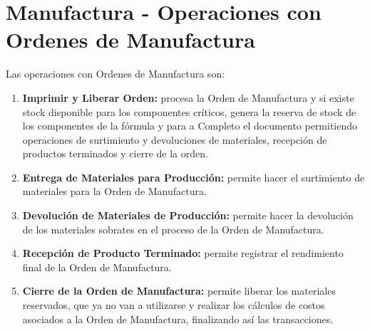 \documentclass[letterpaper,10pt,spanish]{sphinxmanual}
\begin{document}
\section{Manufactura - Operaciones con Ordenes de Manufactura}
\label{manufactura-operaciones:manufactura-operaciones-con-ordenes-de-manufactura}\label{manufactura-operaciones::doc}
Las operaciones con Ordenes de Manufactura son:
\begin{enumerate}
\item {} 
\textbf{Imprimir y Liberar Orden:} procesa la Orden de Manufactura y si existe stock disponible para los componentes críticos, genera la reserva de stock de los componentes de la fórmula y para a Completo el documento permitiendo operaciones de surtimiento y devoluciones de materiales, recepción de productos terminados y cierre de la orden.

\item {} 
\textbf{Entrega de Materiales para Producción:} permite hacer el surtimiento de materiales para la Orden de Manufactura.

\item {} 
\textbf{Devolución de Materiales de Producción:} permite hacer la devolución de los materiales sobrates en el proceso de la Orden de Manufactura.

\item {} 
\textbf{Recepción de Producto Terminado:} permite registrar el rendimiento final de la Orden de Manufactura.

\item {} 
\textbf{Cierre de la Orden de Manufactura:} permite liberar los materiales reservados, que ya no van a utilizarse y realizar los cálculos de costos asociados a la Orden de Manufactura, finalizando así las transacciones.

\end{enumerate}
\end{document}
